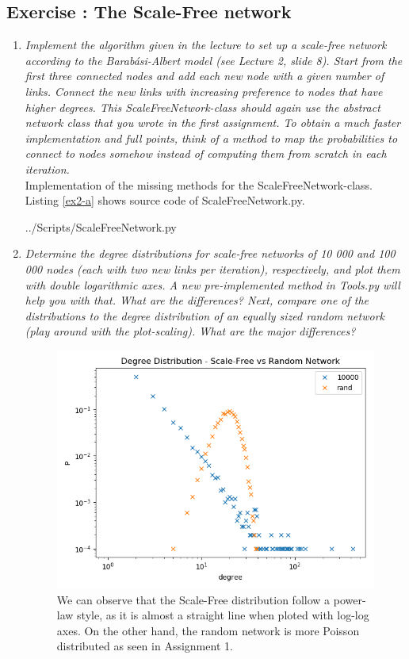 \documentclass[10pt,a4paper]{article}
\newcommand{\exercise}[1]
{
  \stepcounter{subsection}
  \subsection*{Exercise \thesubsection: #1}

}
\begin{document}
\exercise{The Scale-Free network}
\begin{enumerate}
\item \textit{Implement the algorithm given in the lecture to set up a scale-free network according to the
	Barabási-Albert model (see Lecture 2, slide 8). Start from the first three connected nodes
	and add each new node with a given number of links. Connect the new links with increasing
	preference to nodes that have higher degrees. This ScaleFreeNetwork-class should again
	use the abstract network class that you wrote in the first assignment.
	To obtain a much faster implementation and full points, think of a method to map the
	probabilities to connect to nodes somehow instead of computing them from scratch in each
	iteration.}\\
Implementation of the missing methods for the ScaleFreeNetwork-class. Listing \ref{ex2-a} shows source code of ScaleFreeNetwork.py.

 {../Scripts/ScaleFreeNetwork.py}

\item \textit{Determine the degree distributions for scale-free networks of 10 000 and 100 000 nodes
	(each with two new links per iteration), respectively, and plot them with double logarithmic
	axes. A new pre-implemented method in Tools.py will help you with that. What are the
	differences?
	Next, compare one of the distributions to the degree distribution of an equally sized random
	network (play around with the plot-scaling). What are the major differences?
}\\




\begin{figure}[H]
	\centering
	\includegraphics[width=0.7\linewidth]{../Scripts/Figure_1}
	\caption[Scale-Free vs Random]{We can observe that the Scale-Free distribution follow a power-law style, as it is almost a straight line when ploted with log-log axes. On the other hand, the random network is more Poisson distributed as seen in Assignment 1.}
	\label{fig:figure1}
\end{figure}



\end{enumerate}
\end{document}
